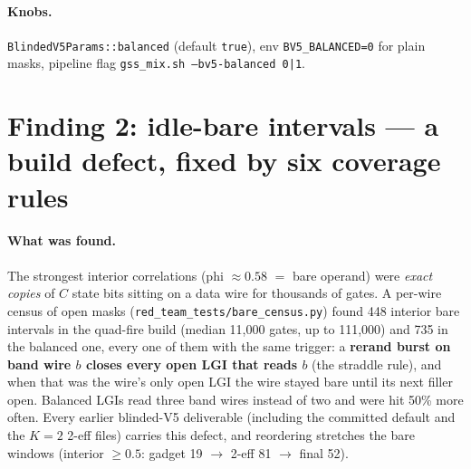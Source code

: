 \documentclass[11pt]{article}
\newcommand{\doc}[1]{\texttt{#1}}
\begin{document}
\paragraph{Knobs.} \doc{BlindedV5Params::balanced} (default \doc{true}), env
\doc{BV5\_BALANCED=0} for plain masks, pipeline flag \doc{gss\_mix.sh --bv5-balanced 0|1}.

\section{Finding 2: idle-bare intervals --- a build defect, fixed by six coverage rules}

\paragraph{What was found.} The strongest interior correlations (phi ${\approx}0.58$ $=$ bare
operand) were \emph{exact copies} of $C$ state bits sitting on a data wire for thousands of
gates. A per-wire census of open masks (\doc{red\_team\_tests/bare\_census.py}) found 448 interior bare intervals in the quad-fire
build (median 11,000 gates, up to 111,000) and 735 in the balanced one, every one of them
with the same trigger: a \textbf{rerand burst on band wire $b$ closes every open LGI that
reads $b$} (the straddle rule), and when that was the wire's only open LGI the wire stayed
bare until its next filler open. Balanced LGIs read three band wires instead of two and were
hit 50\% more often. Every earlier blinded-V5 deliverable (including the committed default
and the $K{=}2$ 2-eff files) carries this defect, and reordering stretches the bare windows
(interior $\ge0.5$: gadget 19 $\to$ 2-eff 81 $\to$ final 52).
\end{document}
